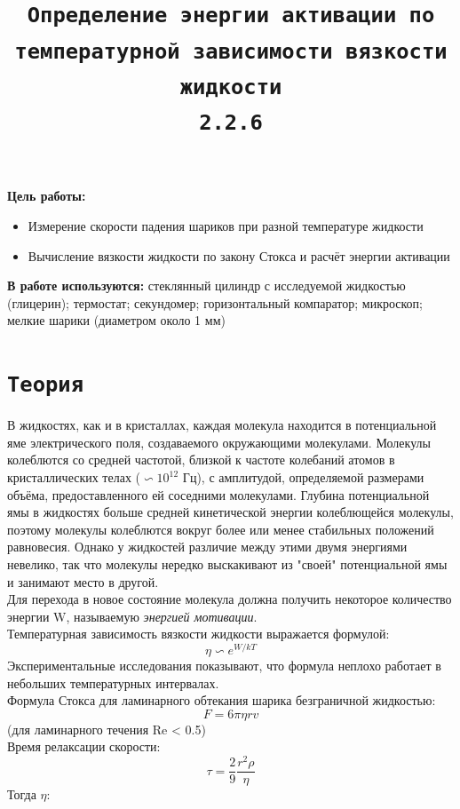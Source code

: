 \documentclass[11pt,a4paper]{article}
\title{\texttt{Определение энергии активации
по температурной зависимости вязкости
жидкости \\ 2.2.6}}
\author{}
\date{}
\begin{document}
  \maketitle

\textbf{Цель работы:}
\begin{itemize}
  \item  Измерение скорости падения шариков при разной
  температуре жидкости
  \item Вычисление вязкости жидкости по закону
  Стокса и расчёт энергии активации
\end{itemize}

\textbf{В работе используются:}  стеклянный цилиндр с исследуемой
 жидкостью (глицерин); термостат; секундомер; горизонтальный компаратор; 
 микроскоп; мелкие шарики (диаметром около 1 мм)

\section*{\texttt{Теория}}
В жидкостях, как и в кристаллах, каждая
молекула находится в потенциальной яме электрического поля, 
создаваемого окружающими молекулами. Молекулы колеблются со средней
частотой, близкой к частоте колебаний атомов в кристаллических телах
($\backsim 10^{12}$ Гц), с амплитудой, определяемой размерами объёма, 
предоставленного ей соседними молекулами. Глубина потенциальной ямы в
жидкостях больше средней кинетической энергии колеблющейся 
молекулы, поэтому молекулы колеблются вокруг более или 
менее стабильных положений равновесия. Однако у жидкостей различие 
между этими двумя энергиями невелико, так что молекулы нередко выскакивают из
"своей" потенциальной ямы и занимают место в другой.\\
Для перехода в новое состояние молекула должна получить
некоторое количество энергии W, называемую \textit{энергией мотивации}.\\
Температурная зависимость вязкости жидкости 
выражается формулой: \[\eta \backsim e^{W/kT}\]
Экспериментальные исследования показывают, что формула
неплохо работает в небольших температурных интервалах.\\
Формула Стокса для ламинарного обтекания шарика безграничной жидкостью:
\[F = 6\pi\eta rv \]
(для ламинарного течения Re < 0.5)\\
Время релаксации скорости:
\[\tau = \frac{2}{9} \frac{r^2\rho}{\eta}\]
Тогда $\eta$:

\begin{center}
\end{center}
\end{document}
